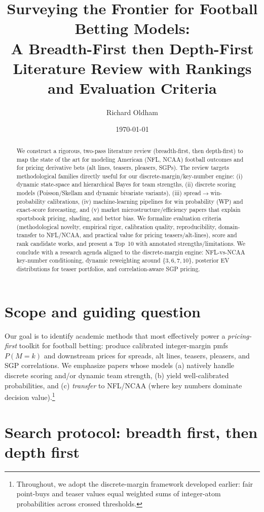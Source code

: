 \documentclass[11pt]{amsart}
\title[Surveying the Frontier for Football Betting Models]{Surveying the Frontier for Football Betting Models:\\
A Breadth-First then Depth-First Literature Review with Rankings and Evaluation Criteria}
\author{Richard Oldham}
\date{\today}
\begin{document}
\maketitle

\begin{abstract}
We construct a rigorous, two-pass literature review (breadth-first, then depth-first) to map the state of the art for modeling American (NFL, NCAA) football outcomes and for pricing derivative bets (alt lines, teasers, pleasers, SGPs). The review targets methodological families directly useful for our discrete-margin/key-number engine: (i) dynamic state-space and hierarchical Bayes for team strengths, (ii) discrete scoring models (Poisson/Skellam and dynamic bivariate variants), (iii) spread$\to$win-probability calibrations, (iv) machine-learning pipelines for win probability (WP) and exact-score forecasting, and (v) market microstructure/efficiency papers that explain sportsbook pricing, shading, and bettor bias. We formalize evaluation criteria (methodological novelty, empirical rigor, calibration quality, reproducibility, domain-transfer to NFL/NCAA, and practical value for pricing teasers/alt-lines), score and rank candidate works, and present a Top~10 with annotated strengths/limitations. We conclude with a research agenda aligned to the discrete-margin engine: NFL-vs-NCAA key-number conditioning, dynamic reweighting around $\{3,6,7,10\}$, posterior EV distributions for teaser portfolios, and correlation-aware SGP pricing.
\end{abstract}

\section{Scope and guiding question}
Our goal is to identify academic methods that most effectively power a \emph{pricing-first} toolkit for football betting: produce calibrated integer-margin pmfs $P(M=k)$ and downstream prices for spreads, alt lines, teasers, pleasers, and SGP correlations. We emphasize papers whose models (a) natively handle discrete scoring and/or dynamic team strength, (b) yield well-calibrated probabilities, and (c) \emph{transfer} to NFL/NCAA (where key numbers dominate decision value).\footnote{Throughout, we adopt the discrete-margin framework developed earlier: fair point-buys and teaser values equal weighted sums of integer-atom probabilities across crossed thresholds.}

\section{Search protocol: breadth first, then depth first}
\end{document}
